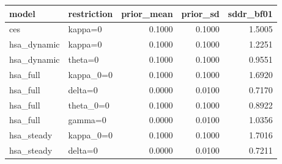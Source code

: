 \begin{tabular}{llrrr}
\toprule
model & restriction & prior\_mean & prior\_sd & sddr\_bf01 \\
\midrule
ces & kappa=0 & 0.1000 & 0.1000 & 1.5005 \\
hsa\_dynamic & kappa=0 & 0.1000 & 0.1000 & 1.2251 \\
hsa\_dynamic & theta=0 & 0.1000 & 0.1000 & 0.9551 \\
hsa\_full & kappa\_0=0 & 0.1000 & 0.1000 & 1.6920 \\
hsa\_full & delta=0 & 0.0000 & 0.0100 & 0.7170 \\
hsa\_full & theta\_0=0 & 0.1000 & 0.1000 & 0.8922 \\
hsa\_full & gamma=0 & 0.0000 & 0.0100 & 1.0356 \\
hsa\_steady & kappa\_0=0 & 0.1000 & 0.1000 & 1.7016 \\
hsa\_steady & delta=0 & 0.0000 & 0.0100 & 0.7211 \\
\bottomrule
\end{tabular}
